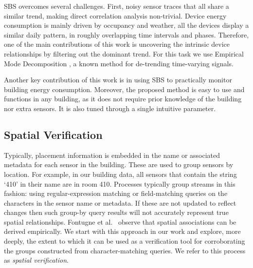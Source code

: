 SBS overcomes several challenges.  First, 
noisy sensor traces that all share a similar trend, making direct correlation analysis non-trivial.
Device energy consumption is mainly driven by occupancy and weather, all the devices display a similar daily pattern, in 
roughly overlapping time intervals and phases.
Therefore, one of the main contributions of this work is uncovering the intrinsic device relationships by filtering out the 
dominant trend.  For this task we use 
Empirical Mode Decomposition \cite{huang:emd1998}, a known method for de-trending time-varying signals.

Another key contribution of this work is in using SBS to practically monitor building energy consumption.
Moreover, the proposed method is easy to use and functions in any building, as it does not require prior knowledge of the building nor extra sensors.  
It is also tuned through a single intuitive parameter.  %



\subsection{Spatial Verification}

Typically, placement information is embedded in the name or associated metadata for each sensor in the building.
These are used to group sensors by location.  For example, in our building data, all sensors that contain the string
 `410' in their name are in room 410.  Processes typically group streams in this fashion: using regular-expression matching 
or field-matching queries on the characters in the sensor name or metadata.  If these are not updated to reflect changes
then such group-by query results will not accurately represent true spatial relationships.  
Fontugne et al.~\cite{IOT} observe that spatial associations can be derived empirically.  We start with this approach in our 
work and explore, more deeply, the extent to which it can be used 
as a verification tool for corroborating the groups constructed from character-matching queries.  We refer
to this process as \emph{spatial verification}.


